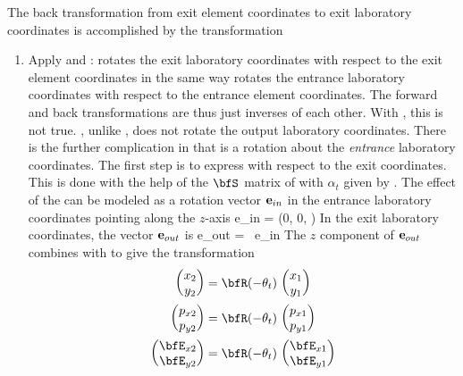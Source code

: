 The back transformation from exit element coordinates to exit
laboratory coordinates is accomplished by the transformation
  \begin{enumerate}
  \item
Apply  and :  rotates the exit
laboratory coordinates with respect to the exit element coordinates in
the same way  rotates the entrance laboratory coordinates
with respect to the entrance element coordinates. The forward and back
transformations are thus just inverses of each other.  With
, this is not true. , unlike , does
not rotate the output laboratory coordinates.  There is the further
complication in that  is a rotation about the {\em
entrance} laboratory coordinates. The first step is to express
 with respect to the exit coordinates. This is done with
the help of the $\bfS$ matrix of  with $\alpha_t$ given by
. The effect of the  can be modeled as a rotation
vector ${\bf e}_{in}$ in the entrance laboratory coordinates pointing
along the $z$-axis
\Begineq
 \Bf e_{in} = (0, 0, )
\Endeq
In the exit laboratory coordinates, the vector ${\bf e}_{out}$ is
\Begineq
  \Bf e_{out} = \bfS \, \Bf e_{in}
\Endeq
The $z$ component of ${\bf e}_{out}$ combines with  to give
the transformation
\begin{align}
  \begin{pmatrix} x_2 \\ y_2 \end{pmatrix} &=
    \bfR (-\theta_{t}) \,   \begin{pmatrix} x_1 \\ y_1 \end{pmatrix} \CRNO
  \begin{pmatrix} p_{x2} \\ p_{y2} \end{pmatrix} &=
    \bfR (-\theta_{t}) \,   \begin{pmatrix} p_{x1} \\ p_{y1} \end{pmatrix} \\
  \begin{pmatrix} \bfE_{x2} \\ \bfE_{y2} \end{pmatrix} &=
    \bfR (-\theta_{t}) \,   \begin{pmatrix} \bfE_{x1} \\ \bfE_{y1} \end{pmatrix} \nonumber
\end{align}

\end{enumerate}
